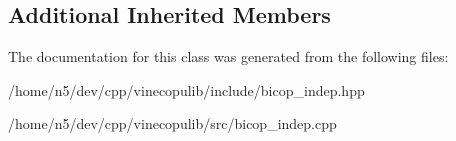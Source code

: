 \subsection*{Additional Inherited Members}


The documentation for this class was generated from the following files\+:\begin{DoxyCompactItemize}
\item 
/home/n5/dev/cpp/vinecopulib/include/bicop\+\_\+indep.\+hpp\item 
/home/n5/dev/cpp/vinecopulib/src/bicop\+\_\+indep.\+cpp\end{DoxyCompactItemize}
